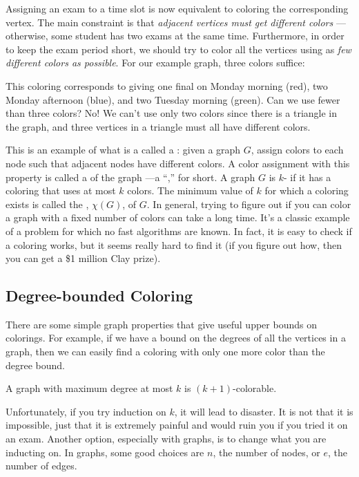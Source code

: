 Assigning an exam to a time slot is now equivalent to coloring the
corresponding vertex.  The main constraint is that \emph{adjacent vertices
  must get different colors} ---otherwise, some student has two exams at
the same time.  Furthermore, in order to keep the exam period short, we
should try to color all the vertices using as \emph{few different colors
  as possible}.  For our example graph, three colors suffice:


This coloring corresponds to giving one final on Monday morning (red),
two Monday afternoon (blue), and two Tuesday morning (green).
Can we use fewer than three colors?  No! We can't use only two colors
since there is a triangle in the graph, and three vertices in a triangle
must all have different colors.

This is an example of what is a called a :
given a graph $G$, assign colors to each node such that adjacent nodes
have different colors.  A color assignment with this property is called a
 of the graph ---a ``,'' for short.  A
graph $G$ is $k$- if it has a coloring that uses at most
$k$ colors.  The minimum value of $k$ for which a coloring exists is
called the , $\chi(G)$, of $G$.  In general, trying
to figure out if you can color a graph with a fixed number of colors can
take a long time.  It's a classic example of a problem for which no fast
algorithms are known.  In fact, it is easy to check if a coloring works,
but it seems really hard to find it (if you figure out how, then you can
get a \$1 million Clay prize).

\subsection{Degree-bounded Coloring}
There are some simple graph properties that give useful upper bounds on
colorings.  For example, if we have a bound on the degrees of all the
vertices in a graph, then we can easily find a coloring with only one more
color than the degree bound.

\begin{theorem}\label{k+1-colorable}
A graph with maximum degree at most $k$ is $(k+1)$-colorable.
\end{theorem}

Unfortunately, if you try induction on $k$, it will lead to disaster.  It
is not that it is impossible, just that it is extremely painful and would
ruin you if you tried it on an exam.  Another option, especially with
graphs, is to change what you are inducting on.  In graphs, some good
choices are $n$, the number of nodes, or $e$, the number of edges.

